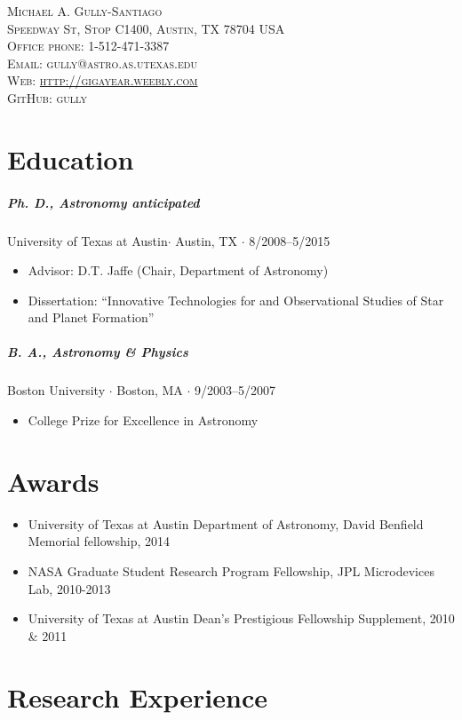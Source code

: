 \documentclass[10pt,letterpaper]{article}
\newcommand{\namestyle}{\Huge \scshape}
\newcommand{\addressstyle}{\color{addresscolor}  \footnotesize \sffamily \upshape}
\begin{document}
\begin{flushright}
    \namestyle Michael A. Gully-Santiago \\[0.3em]
    \addressstyle 
    2515 Speedway St, Stop C1400, Austin, TX 78704 USA \\
    Office phone: 1-512-471-3387\\
    Email: gully@astro.as.utexas.edu \\
    Web: \url{http://gigayear.weebly.com} \\
    GitHub: gully
\end{flushright}

\small

\section*{Education}

\subparagraph{Ph. D., Astronomy \emph{anticipated}}
University of Texas at Austin$\cdot$ Austin, TX $\cdot$ 8/2008--5/2015
\begin{itemize}
    \item Advisor: D.T. Jaffe (Chair, Department of Astronomy)
    \item Dissertation: ``Innovative Technologies for and Observational Studies of Star and Planet Formation''
\end{itemize}

\subparagraph{B. A., Astronomy \& Physics}
Boston University $\cdot$ Boston, MA $\cdot$ 9/2003--5/2007
\begin{itemize}
    \item College Prize for Excellence in Astronomy
\end{itemize}


\section*{Awards}

\begin{itemize}
    \item University of Texas at Austin Department of Astronomy, David Benfield Memorial fellowship, 2014
    \item NASA Graduate Student Research Program Fellowship, JPL Microdevices Lab, 2010-2013
    \item University of Texas at Austin Dean's Prestigious Fellowship Supplement, 2010 \& 2011
\end{itemize}


\section*{Research Experience}
\end{document}
